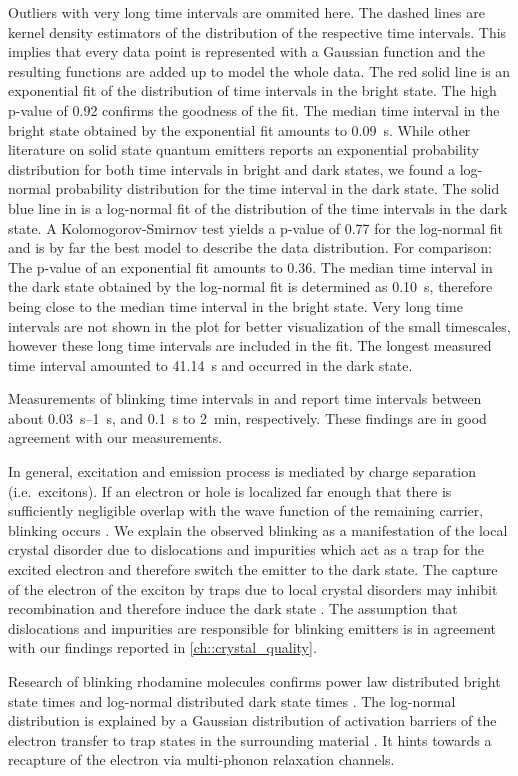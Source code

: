 		Outliers with very long time intervals are ommited here.
		The dashed lines are kernel density estimators of the distribution of the respective time intervals.
		This implies that every data point is represented with a Gaussian function and the resulting functions are added up to model the whole data.
		The red solid line is an exponential fit of the distribution of time intervals in the bright state.
		The high p-value of \num{0.92} confirms the goodness of the fit.
		The median time interval in the bright state obtained by the exponential fit amounts to \SI[separate-uncertainty]{0.09}{s}.
		While other literature on solid state quantum emitters reports an exponential probability distribution for both time intervals in bright and dark states\cite{Bradac2010,Berhane2017}, we found a log-normal probability distribution for the time interval in the dark state.
		The solid blue line in  is a log-normal fit of the distribution of the time intervals in the dark state.
		A Kolomogorov-Smirnov test yields a p-value of \num{0.77} for the log-normal fit and is by far the best model to describe the data distribution.
		For comparison: The p-value of an exponential fit amounts to \num{0.36}.
		The median time interval in the dark state obtained by the log-normal fit is determined as \SI{0.10}{s}, therefore being close to the median time interval in the bright state.
		Very long time intervals are not shown in the plot for better visualization of the small timescales, however these long time intervals are included in the fit.
		The longest measured time interval amounted to \SI{41.14}{s} and occurred in the dark state.
		
		Measurements of blinking time intervals in \cite{Jantzen2016} and \cite{Neu2012a} report time intervals between about \SIrange{0.03}{1}{s}, and \SI{0.1}{s} to \SI{2}{min}, respectively.
		These findings are in good agreement with our measurements.
		
		In general, excitation and emission process is mediated by charge separation (i.e.\ excitons).
		If an electron or hole is localized far enough that there is sufficiently negligible overlap with the wave function of the remaining carrier, blinking occurs \cite{Efros2016}.
		We explain the observed blinking as a manifestation of the local crystal disorder due to dislocations and impurities which act as a trap for the excited electron and therefore switch the emitter to the dark state.
		The capture of the electron of the exciton by traps due to local crystal disorders may inhibit recombination and therefore induce the dark state \cite{Bradac2010}.
		The assumption that dislocations and impurities are responsible for blinking emitters is in agreement with our findings reported in \ref{ch::crystal_quality}.
		
		Research of blinking rhodamine molecules confirms power law distributed bright state times and log-normal distributed dark state times \cite{Wong2013}.
		The log-normal distribution is explained by a Gaussian distribution of activation barriers of the electron transfer to trap states in the surrounding material \cite{Albery1985}.
		It hints towards a recapture of the electron via multi-phonon relaxation channels.
